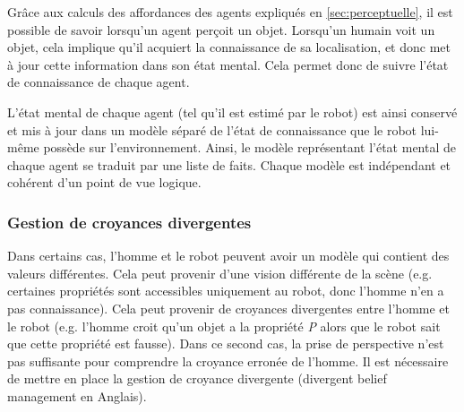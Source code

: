 \documentclass[a4paper,11pt,twoside]{StyleThese}
\begin{document}
Grâce aux calculs des affordances des agents expliqués en \ref{sec:perceptuelle}, il est possible de savoir lorsqu'un agent perçoit un objet. Lorsqu'un humain voit un objet, cela implique qu'il acquiert la connaissance de sa localisation, et donc met à jour cette information dans son état mental. Cela permet donc de suivre l'état de connaissance de chaque agent.

L'état mental de chaque agent (tel qu'il est estimé par le robot) est ainsi conservé et mis à jour dans un modèle séparé de l'état de connaissance que le robot lui-même possède sur l'environnement. Ainsi, le modèle représentant l'état mental de chaque agent se traduit par une liste de faits. Chaque modèle est indépendant et cohérent d'un point de vue logique.





\subsubsection{Gestion de croyances divergentes}
\label{sec:divB}
Dans certains cas, l'homme et le robot peuvent avoir un modèle qui contient des valeurs différentes. Cela peut provenir d'une vision différente de la scène (e.g. certaines propriétés sont accessibles uniquement au robot, donc l'homme n'en a pas connaissance).
Cela peut provenir de croyances divergentes entre l'homme et le robot (e.g. l'homme croit qu'un objet a la propriété \textit{P} alors que le robot sait que cette propriété est fausse). Dans ce second cas, la prise de perspective n'est pas suffisante pour comprendre la croyance erronée de l'homme. Il est nécessaire de mettre en place la gestion de croyance divergente (divergent belief management en Anglais).
\end{document}
